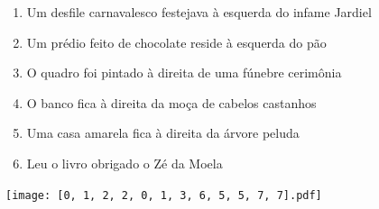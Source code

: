 \documentclass[12pt]{article}
\begin{document}
		 

\pagebreak


	\begin{enumerate}
		  \sffamily %
		  \large %


\vfill \item
Um desfile carnavalesco festejava	%
à esquerda
do infame Jardiel	%

\vfill \item
Um prédio feito de chocolate reside	%
à esquerda
do pão	%

\vfill \item
O quadro foi pintado	%
à direita
de uma fúnebre cerimônia	%

\vfill \item
O banco fica	%
à direita
da moça de cabelos castanhos	%

\vfill \item
Uma casa amarela fica	%
à direita
da árvore peluda	%

\vfill \item
Leu o livro obrigado	%
o Zé da Moela	%
	\end{enumerate}
		  
		  \hfill

		  \vfill

\texttt{[image: [0, 1, 2, 2, 0, 1, 3, 6, 5, 5, 7, 7].pdf]}


	\hfill	  	  


\pagebreak			
\end{document}
